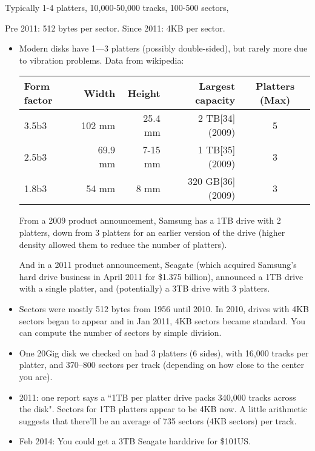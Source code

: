 \begin{frame}[fragile]

Typically 1-4 platters, 10,000-50,000 tracks, 100-500 sectors, 

Pre 2011: 512 bytes per sector.  Since 2011: 4KB per sector.
\BNotes\ifnum{}
\begin{itemize}
	\item Modern disks have 1---3 platters (possibly double-sided),
		but rarely more due to vibration problems.  Data from
		wikipedia:
\begin{tabular}{lrrrc}
Form factor &	Width 	&Height 	&Largest capacity 	&Platters (Max)\\
\hline
3.5b3 &	102 mm &	25.4 mm &	2 TB[34] (2009) 	&5\\
2.5b3 &	69.9 mm &	7-15 mm &	1 TB[35] (2009) 	&3\\
1.8b3 &	54 mm &		8 mm &		320 GB[36] (2009) 	&3\\
\end{tabular}

From a 2009 product announcement, Samsung has a 1TB drive with 2 platters,
down from 3 platters for an earlier version of the drive (higher density
allowed them to reduce the number of platters).

And in a 2011 product announcement, Seagate (which acquired Samsung's hard drive business in April 2011 for \$1.375 billion), announced a 1TB drive with a single platter, and (potentially) a 3TB drive with 3 platters.
	\item Sectors were mostly 512 bytes from 1956 until 2010.
		In 2010, drives with 4KB sectors began to appear and in
		Jan 2011, 4KB sectors became standard.  
		You can compute the number
		of sectors by simple division.
	\item One 20Gig disk we checked on had 3 platters (6 sides), 
		with 16,000 tracks per platter,
		and 370--800 sectors per track (depending on how close
		to the center you are).
	\item 2011: one report says a ``1TB per platter drive packs
		340,000 tracks across the disk".  Sectors for 1TB platters
		appear to be 4KB now.  A little arithmetic suggests that
		there'll be an average of 735 sectors (4KB sectors) per
		track.
	\item Feb 2014: You could get a 3TB Seagate harddrive for \$101US.
\end{itemize}
\fi\ENotes
\end{frame}

